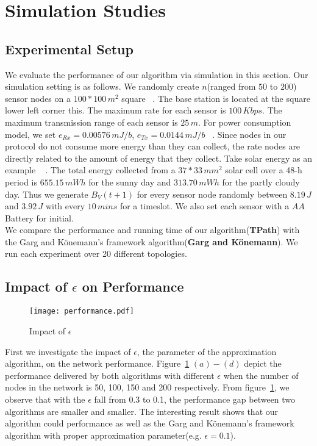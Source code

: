 \documentclass{article}
\begin{document}
\section{Simulation Studies}
\subsection{Experimental Setup}
We evaluate the performance of our algorithm via simulation in this section.
Our simulation setting is as follows. We randomly create $n$(ranged from $50$ to $200$) sensor nodes
on a $100*100\,m^2$ square ~\cite{Maxi}. The base station is located at the square lower left corner this. The maximum rate for each sensor is $100\,Kbps$. The maximum transmission range of each sensor is $25\,m$. For power consumption model, we set $e_{Rx} = 0.00576\,mJ/b$, $e_{Tx} = 0.0144\,mJ/b$ ~\cite{Ene}. Since nodes in our protocol do not 
consume more energy than they can collect, the rate nodes are directly related to the amount of energy that they collect. Take solar energy as an example ~\cite{Ste} . The total energy collected from a $37 * 33\,mm^2$ solar cell over a 48-h period is $655.15\,mWh$ for the sunny day and $313.70\,mWh$ for the partly cloudy day. Thus we generate $B_V(t+1)$ for every sensor node randomly between $8.19\,J$ and $3.92\,J$ with every $10\,mins$ for a timeslot. We also set each sensor with a $AA$ Battery for initial.\\
We compare the performance and running time of our algorithm(\textbf{TPath}) with the Garg and K\"{o}nemann's framework algorithm(\textbf{Garg and K\"{o}nemann}). We run each experiment over 20 different topologies.

\subsection{Impact of $\epsilon$ on Performance}

\begin{figure}[H]
\centering
\texttt{[image: performance.pdf]} 
\caption{Impact of $\epsilon$}
\label{f1}
\end{figure}

First we investigate the impact of $\epsilon$, the parameter of the approximation algorithm, on the network performance. Figure~\ref{f1} $(a)-(d)$ depict the performance delivered by both algorithms with different $\epsilon$ when the number of nodes in the network is 50, 100, 150 and 200 respectively. From figure~\ref{f1}, we observe that with the $\epsilon$ fall from 0.3 to 0.1, the performance gap between two algorithms are smaller and smaller. The interesting result shows that our algorithm could performance as well as the Garg and K\"{o}nemann's framework algorithm with proper approximation parameter(e.g. $\epsilon = 0.1$).
\end{document}
